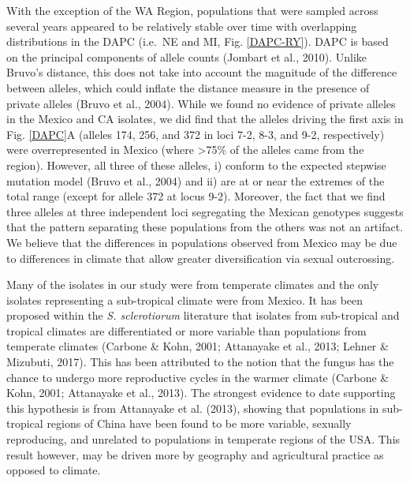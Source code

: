 With the exception of the WA Region, populations that were sampled
across several years appeared to be relatively stable over time with
overlapping distributions in the DAPC (i.e.~NE and MI, Fig.
\ref{DAPC-RY}). DAPC is based on the principal components of allele
counts (Jombart et al., 2010). Unlike Bruvo's distance, this does not
take into account the magnitude of the difference between alleles, which
could inflate the distance measure in the presence of private alleles
(Bruvo et al., 2004). While we found no evidence of private alleles in
the Mexico and CA isolates, we did find that the alleles driving the
first axis in Fig. \ref{DAPC}A (alleles 174, 256, and 372 in loci 7-2,
8-3, and 9-2, respectively) were overrepresented in Mexico (where
\textgreater{}75\% of the alleles came from the region). However, all
three of these alleles, i) conform to the expected stepwise mutation
model (Bruvo et al., 2004) and ii) are at or near the extremes of the
total range (except for allele 372 at locus 9-2). Moreover, the fact
that we find three alleles at three independent loci segregating the
Mexican genotypes suggests that the pattern separating these populations
from the others was not an artifact. We believe that the differences in
populations observed from Mexico may be due to differences in climate
that allow greater diversification via sexual outcrossing.

Many of the isolates in our study were from temperate climates and the
only isolates representing a sub-tropical climate were from Mexico. It
has been proposed within the \emph{S. sclerotiorum} literature that
isolates from sub-tropical and tropical climates are differentiated or
more variable than populations from temperate climates (Carbone \& Kohn,
2001; Attanayake et al., 2013; Lehner \& Mizubuti, 2017). This has been
attributed to the notion that the fungus has the chance to undergo more
reproductive cycles in the warmer climate (Carbone \& Kohn, 2001;
Attanayake et al., 2013). The strongest evidence to date supporting this
hypothesis is from Attanayake et al. (2013), showing that populations in
sub-tropical regions of China have been found to be more variable,
sexually reproducing, and unrelated to populations in temperate regions
of the USA. This result however, may be driven more by geography and
agricultural practice as opposed to climate.

